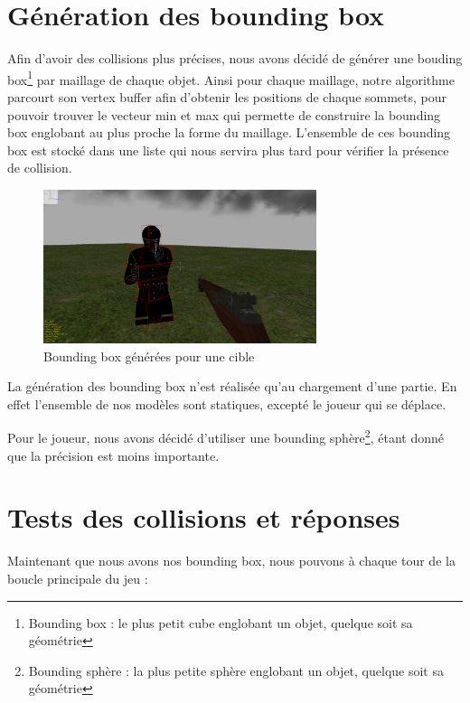 \documentclass[11pt]{report}
\begin{document}
\section{Génération des bounding box}

Afin d'avoir des collisions plus précises, nous avons décidé de générer une bouding box\footnote{Bounding box : le plus petit cube englobant un objet, quelque soit sa géométrie} par maillage de chaque objet. Ainsi pour chaque maillage, notre algorithme parcourt son vertex buffer afin d'obtenir les positions de chaque sommets, pour pouvoir trouver le vecteur min et max qui permette de construire la bounding box englobant au plus proche la forme du maillage. L'ensemble de ces bounding box est stocké dans une liste qui nous servira plus tard pour vérifier la présence de collision.

\begin{figure}[htbp]
\centering
\includegraphics[width=8cm]{multiple-box.png}
\caption{Bounding box générées pour une cible}
\end{figure}

La génération des bounding box n'est réalisée qu'au chargement d'une partie. En effet l'ensemble de nos modèles sont statiques, excepté le joueur qui se déplace.

Pour le joueur, nous avons décidé d'utiliser une bounding sphère\footnote{Bounding sphère : la plus petite sphère englobant un objet, quelque soit sa géométrie}, étant donné que la précision est moins importante.

\section{Tests des collisions et réponses}

Maintenant que nous avons nos bounding box, nous pouvons à chaque tour de la boucle principale du jeu :
\end{document}
